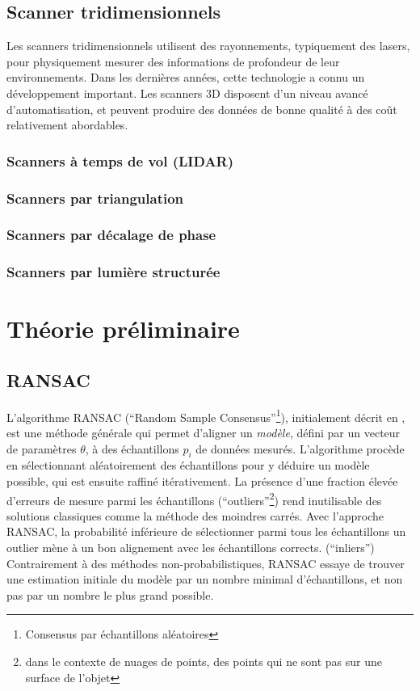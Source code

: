 \documentclass[a4paper,10pt]{scrreprt}
\begin{document}
\subsection{Scanner tridimensionnels}
Les scanners tridimensionnels utilisent des rayonnements, typiquement des lasers, pour physiquement mesurer des informations de profondeur de leur environnements. Dans les dernières années, cette technologie a connu un développement important. Les scanners 3D disposent d'un niveau avancé d'automatisation, et peuvent produire des données de bonne qualité \cite{Grus2012} à des coût relativement abordables.

\subsubsection{Scanners à temps de vol (LIDAR)}
\subsubsection{Scanners par triangulation}
\subsubsection{Scanners par décalage de phase}
\subsubsection{Scanners par lumière structurée}


\section{Théorie préliminaire}

\subsection{RANSAC}
L'algorithme RANSAC (``Random Sample Consensus''\footnote{Consensus par échantillons aléatoires}), initialement décrit en \cite{Fisc1980}, est une méthode générale qui permet d'aligner un \emph{modèle}, défini par un vecteur de paramètres $\theta$, à des échantillons $p_i$ de données mesurés. L'algorithme procède en sélectionnant aléatoirement des échantillons pour y déduire un modèle possible, qui est ensuite raffiné itérativement. La présence d'une fraction élevée d'erreurs de mesure parmi les échantillons (``outliers''\footnote{dans le contexte de nuages de points, des points qui ne sont pas sur une surface de l'objet}) rend inutilisable des solutions classiques comme la méthode des moindres carrés. Avec l'approche RANSAC, la probabilité inférieure de sélectionner parmi tous les échantillons un outlier mène à un bon alignement avec les échantillons corrects. (``inliers'') Contrairement à des méthodes non-probabilistiques, RANSAC essaye de trouver une estimation initiale du modèle par un nombre minimal d'échantillons, et non pas par un nombre le plus grand possible.
\end{document}
